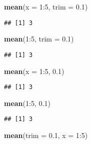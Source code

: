\documentclass[]{book}
\newenvironment{Shaded}{\begin{snugshade}}{\end{snugshade}}
\newcommand{\KeywordTok}[1]{\textcolor[rgb]{0.13,0.29,0.53}{\textbf{{#1}}}}
\newcommand{\DataTypeTok}[1]{\textcolor[rgb]{0.13,0.29,0.53}{{#1}}}
\newcommand{\DecValTok}[1]{\textcolor[rgb]{0.00,0.00,0.81}{{#1}}}
\newcommand{\FloatTok}[1]{\textcolor[rgb]{0.00,0.00,0.81}{{#1}}}
\newcommand{\NormalTok}[1]{{#1}}
\begin{document}
\begin{Shaded}
\begin{Highlighting}[]
\KeywordTok{mean}\NormalTok{(}\DataTypeTok{x =} \DecValTok{1}\NormalTok{:}\DecValTok{5}\NormalTok{, }\DataTypeTok{trim =} \FloatTok{0.1}\NormalTok{)}
\end{Highlighting}
\end{Shaded}

\begin{verbatim}
## [1] 3
\end{verbatim}

\begin{Shaded}
\begin{Highlighting}[]
\KeywordTok{mean}\NormalTok{(}\DecValTok{1}\NormalTok{:}\DecValTok{5}\NormalTok{, }\DataTypeTok{trim =} \FloatTok{0.1}\NormalTok{)}
\end{Highlighting}
\end{Shaded}

\begin{verbatim}
## [1] 3
\end{verbatim}

\begin{Shaded}
\begin{Highlighting}[]
\KeywordTok{mean}\NormalTok{(}\DataTypeTok{x =} \DecValTok{1}\NormalTok{:}\DecValTok{5}\NormalTok{, }\FloatTok{0.1}\NormalTok{)}
\end{Highlighting}
\end{Shaded}

\begin{verbatim}
## [1] 3
\end{verbatim}

\begin{Shaded}
\begin{Highlighting}[]
\KeywordTok{mean}\NormalTok{(}\DecValTok{1}\NormalTok{:}\DecValTok{5}\NormalTok{, }\FloatTok{0.1}\NormalTok{)}
\end{Highlighting}
\end{Shaded}

\begin{verbatim}
## [1] 3
\end{verbatim}

\begin{Shaded}
\begin{Highlighting}[]
\KeywordTok{mean}\NormalTok{(}\DataTypeTok{trim =} \FloatTok{0.1}\NormalTok{, }\DataTypeTok{x =} \DecValTok{1}\NormalTok{:}\DecValTok{5}\NormalTok{)}
\end{Highlighting}
\end{Shaded}
\end{document}
